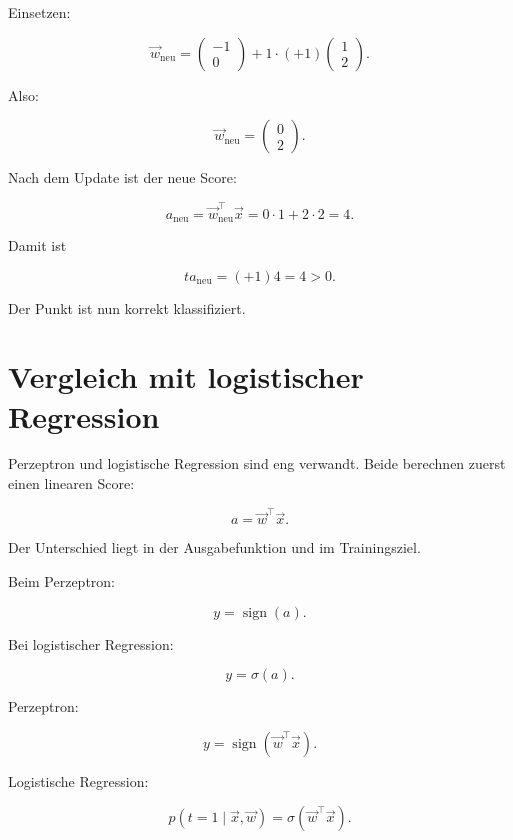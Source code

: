 Einsetzen:

\[
    \vec{w}_{\mathrm{neu}}
    =
    \begin{pmatrix}
        -1 \\
        0
    \end{pmatrix}
    +
    1\cdot(+1)
    \begin{pmatrix}
        1 \\
        2
    \end{pmatrix}.
\]

Also:

\[
    \vec{w}_{\mathrm{neu}}
    =
    \begin{pmatrix}
        0 \\
        2
    \end{pmatrix}.
\]

\begin{examplebox}
Nach dem Update ist der neue Score:

\[
    a_{\mathrm{neu}}
    =
    \vec{w}_{\mathrm{neu}}^{\top}\vec{x}
    =
    0\cdot 1+2\cdot 2
    =
    4.
\]

Damit ist

\[
    t a_{\mathrm{neu}}
    =
    (+1)4
    =
    4
    >
    0.
\]

Der Punkt ist nun korrekt klassifiziert.
\end{examplebox}

\section{Vergleich mit logistischer Regression}

Perzeptron und logistische Regression sind eng verwandt.
Beide berechnen zuerst einen linearen Score:

\[
    a
    =
    \vec{w}^{\top}\vec{x}.
\]

Der Unterschied liegt in der Ausgabefunktion und im Trainingsziel.

Beim Perzeptron:

\[
    y
    =
    \operatorname{sign}(a).
\]

Bei logistischer Regression:

\[
    y
    =
    \sigma(a).
\]

\begin{definitionbox}
Perzeptron:

\[
    y
    =
    \operatorname{sign}(\vec{w}^{\top}\vec{x}).
\]

Logistische Regression:

\[
    p(t=1\mid\vec{x},\vec{w})
    =
    \sigma(\vec{w}^{\top}\vec{x}).
\]
\end{definitionbox}

